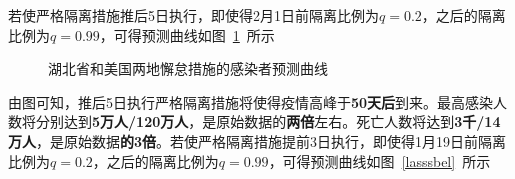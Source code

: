 \documentclass{whutmod}
\begin{document}
        若使严格隔离措施推后5日执行，即使得2月1日前隔离比例为$q=0.2$，之后的隔离比例为$q=0.99$，可得预测曲线如图~\ref{label}~所示
                \begin{figure}[H]
        	\centering
        	\caption{湖北省和美国两地懈怠措施的感染者预测曲线}\label{label}
        \end{figure}
    
    
        由图可知，推后5日执行严格隔离措施将使得疫情高峰于\textbf{50天后}到来。最高感染人数将分别达到\textbf{5万人/120万人}，是原始数据的\textbf{两倍}左右。死亡人数将达到\textbf{3千/14万人}，是原始数据\textbf{的3倍}。若使严格隔离措施提前3日执行，即使得1月19日前隔离比例为$q=0.2$，之后的隔离比例为$q=0.99$，可得预测曲线如图~\ref{lasssbel}~所示
        
\end{document}
